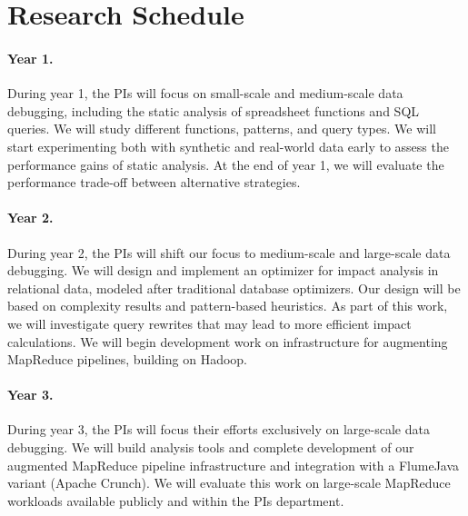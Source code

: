 \section{Research Schedule} %
\label{sec:research_schedule}

\paragraph{Year 1.} %
\label{par:year_1}
During year 1, the PIs will focus on small-scale and medium-scale data
debugging, including the static analysis of spreadsheet functions and
SQL queries. We will study different functions, patterns, and query
types. We will start experimenting both with synthetic and real-world
data early to assess the performance gains of static analysis. At the
end of year 1, we will evaluate the performance trade-off between
alternative strategies.

\paragraph{Year 2.} %
\label{par:year_2}
During year 2, the PIs will shift our focus to medium-scale and
large-scale data debugging. We will design and implement an optimizer
for impact analysis in relational data, modeled after traditional
database optimizers. Our design will be based on complexity results
and pattern-based heuristics.  As part of this work, we will
investigate query rewrites that may lead to more efficient impact
calculations. We will begin development work on infrastructure for
augmenting MapReduce pipelines, building on Hadoop.

\paragraph{Year 3.} %
\label{par:year_3}
During year 3, the PIs will focus their efforts exclusively on
large-scale data debugging. We will build analysis tools and complete
development of our augmented MapReduce pipeline infrastructure and
integration with a FlumeJava variant (Apache Crunch). We will evaluate this
work on large-scale MapReduce workloads available publicly and within
the PIs department.


